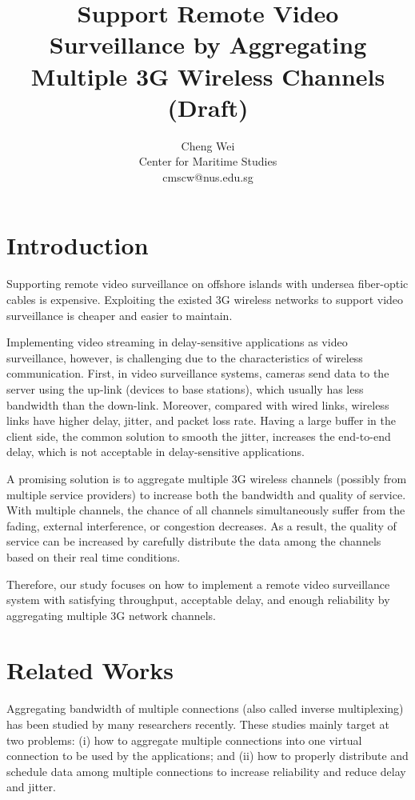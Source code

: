 \documentclass{article}
\title{Support Remote Video Surveillance by Aggregating Multiple 3G Wireless Channels (Draft)}
\author{Cheng Wei\\Center for Maritime Studies\\cmscw@nus.edu.sg}
\begin{document}
\maketitle
\doublespace
\section{Introduction}
    Supporting remote video surveillance on offshore islands
    with undersea fiber-optic cables is expensive. 
    Exploiting the existed 3G wireless networks to support 
    video surveillance is cheaper and easier to maintain.   
    
    Implementing video streaming in delay-sensitive applications
    as video surveillance, however, is challenging due to the characteristics
	of wireless communication. 
    First, in video surveillance systems, cameras send data to the server
    using the up-link (devices to base stations), 
    which usually has less bandwidth than the down-link.
    Moreover, compared with wired links, 
    wireless links have higher delay, jitter, and packet loss rate.
	Having a large buffer in the client side, the common solution to smooth the jitter, 
    increases the end-to-end delay, 
	which is not acceptable in delay-sensitive applications.

	A promising solution is to aggregate multiple 3G wireless channels
    (possibly from multiple service providers) 
    to increase both the bandwidth and quality of service. 
	With multiple channels, the chance of all channels simultaneously suffer 
	from the fading, external interference, or congestion decreases. 
    As a result, the quality of service can be increased by carefully distribute the
    data among the channels based on their real time conditions. 

	Therefore, our study focuses on how to implement a remote video surveillance system
    with satisfying throughput, acceptable delay, and enough reliability 
	by aggregating multiple 3G network channels. 
\section{Related Works}
    Aggregating bandwidth of multiple connections (also called inverse multiplexing)
    has been studied by many researchers recently. 
    These studies mainly target at two problems:
    (i) how to aggregate multiple connections into one virtual connection
    to be used by the applications; and
    (ii) how to properly distribute and schedule data among multiple connections
    to increase reliability and reduce delay and jitter.
\end{document}
